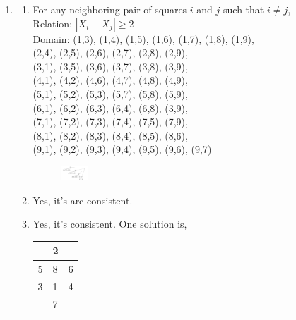 \documentclass{article}
\begin{document}
\begin{enumerate}
\item
    \begin{enumerate}
    \item
    For any neighboring pair of squares $i$ and $j$ such that $i \neq j$, \\
    Relation: $|X_i-X_j| \geqslant 2$ \\
    Domain: (1,3), (1,4), (1,5), (1,6), (1,7), (1,8), (1,9), \\
            (2,4), (2,5), (2,6), (2,7), (2,8), (2,9), \\
            (3,1), (3,5), (3,6), (3,7), (3,8), (3,9), \\
            (4,1), (4,2), (4,6), (4,7), (4,8), (4,9), \\
            (5,1), (5,2), (5,3), (5,7), (5,8), (5,9), \\
            (6,1), (6,2), (6,3), (6,4), (6,8), (3,9), \\
            (7,1), (7,2), (7,3), (7,4), (7,5), (7,9), \\
            (8,1), (8,2), (8,3), (8,4), (8,5), (8,6), \\
            (9,1), (9,2), (9,3), (9,4), (9,5), (9,6), (9,7)
    
    \begin{figure}[ht]
    \includegraphics[width=0.1\textwidth]{figure/Slide1.PNG}
    \caption{}
    \end{figure}

    \item
    Yes, it's arc-consistent.
    
    \item
    Yes, it's consistent. One solution is,

    \begin{table}[h]
    \centering
    \begin{tabular}{l|l|l}
    \cline{2-2}
                            & 2 &                        \\ \hline
    \multicolumn{1}{|l|}{5} & 8 & \multicolumn{1}{l|}{6} \\ \hline
    \multicolumn{1}{|l|}{3} & 1 & \multicolumn{1}{l|}{4} \\ \hline
                            & 7 &                        \\ \cline{2-2}
    \end{tabular}
    \end{table}


\end{enumerate}
\end{enumerate}
\end{document}
